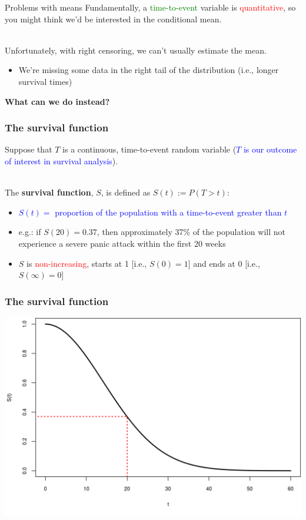 \documentclass[10pt,t]{beamer}
\begin{document}
\begin{frame}{Problems with means}
	Fundamentally, a \textcolor{green}{time-to-event} variable is \textcolor{red}{quantitative}, so you might think we'd be interested in the conditional mean.
	\\ ~\ 
	
	Unfortunately, with right censoring, we can't usually estimate the mean.  
	\begin{itemize}
		\item We're missing some data in the right tail of the distribution (i.e., longer survival times)
	\end{itemize}
	\vspace{1cm}
	\textbf{What can we do instead?} 
\end{frame}
\begin{frame}
\frametitle{The survival function}
Suppose that $T$ is a continuous, time-to-event random variable (\textcolor{blue}{$T$ is our outcome of interest in survival analysis}).
\\ ~\ 

The \textbf{survival function}, $S$, is defined as $S(t) := P(T > t)$:\pause 
\begin{itemize}
\item \textcolor{blue}{$S(t) = $ proportion of the population with a time-to-event greater than $t$}\pause 
\item e.g.: if $S(20) = 0.37$, then approximately 37\% of the population will not experience a severe panic attack within the first 20 weeks\pause 
\item $S$ is \textcolor{red}{non-increasing}, starts at 1 [i.e., $S(0) = 1$] and ends at 0 [i.e., $S(\infty) = 0$]
\end{itemize}
\end{frame}

\begin{frame}
\frametitle{The survival function}
\includegraphics[height=0.8\textheight]{figs/survival_function.png}
\end{frame}
\end{document}
